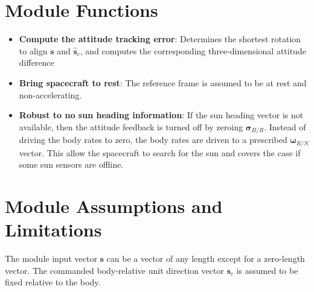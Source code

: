 

\section{Module Functions}
\begin{itemize}
	\item \textbf{Compute the attitude tracking error}: Determines the shortest rotation to align $\bm s$ and $\hat{\bm s}_{c}$, and computes the corresponding three-dimensional attitude difference
	\item \textbf{Bring spacecraft to rest}: The reference frame is assumed to be at rest and non-accelerating.  
	
	\item \textbf{Robust to no sun heading information}: If the sun heading vector is not available, then the attitude feedback is turned off by zeroing $\bm\sigma_{B/R}$.  Instead of driving the body rates to zero, the body rates are driven to a prescribed $\bm\omega_{R/N}$ vector.  This allow the spacecraft to search for the sun and covers the case if some sun sensors are offline.  
\end{itemize}

\section{Module Assumptions and Limitations}
The module input vector $\bm s$ can be a vector of any length except for a zero-length vector.  The commanded body-relative unit direction vector ${\bm s}_{c}$ is assumed to be fixed relative to the body.  